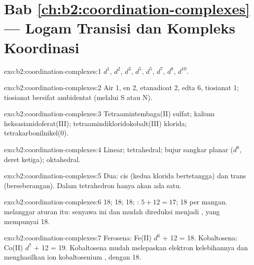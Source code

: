 \section*{Bab \ref{ch:b2:coordination-complexes} --- Logam Transisi dan Kompleks Koordinasi}

\begin{solution}{exo:b2:coordination-complexes:1}
 $d^1$,  $d^2$,  $d^3$,  $d^5$,  $d^5$, 
$d^7$,  $d^8$,  $d^{10}$.
\end{solution}

\begin{solution}{exo:b2:coordination-complexes:2}
Air 1, en 2, etanadioat 2, edta 6, tiosianat 1; tiosianat bersifat
ambidentat (melalui S atau N).
\end{solution}

\begin{solution}{exo:b2:coordination-complexes:3}
Tetraamintembaga(II) sulfat; kalium heksasianidoferat(III);
tetraamindikloridokobalt(III) klorida; tetrakarbonilnikel(0).
\end{solution}

\begin{solution}{exo:b2:coordination-complexes:4}
Linear; tetrahedral; bujur sangkar planar ($d^8$, deret ketiga); oktahedral.
\end{solution}

\begin{solution}{exo:b2:coordination-complexes:5}
Dua: cis (kedua klorida bertetangga) dan trans (berseberangan). Dalam
tetrahedron hanya akan ada satu.
\end{solution}

\begin{solution}{exo:b2:coordination-complexes:6}
 18;  18;  18; : $5 + 12 = 17$;
 18 per mangan.  melanggar aturan itu: senyawa ini
 dan mudah direduksi menjadi \ce{[V(CO)6]-}, yang mempunyai 18.
\end{solution}

\begin{solution}{exo:b2:coordination-complexes:7}
Ferosena: Fe(II) $d^6$ + 12 = 18. Kobaltosena: Co(II) $d^7$ + 12 = 19.
Kobaltosena mudah melepaskan elektron kelebihannya dan menghasilkan ion
kobaltosenium \ce{[Co(C5H5)2]+}, dengan 18.
\end{solution}

